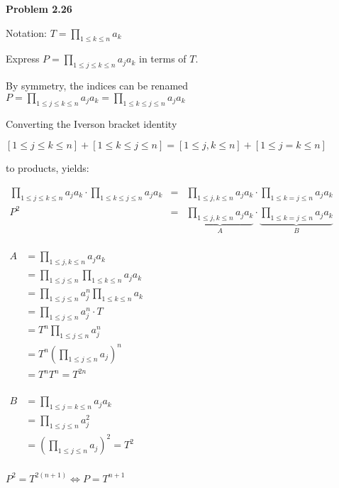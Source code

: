 \documentclass[a4paper,10pt,fleqn]{article}
\begin{document}
\newcommand{\ffac}[1]{%
  x^{\underline{#1}}%
}
\newcommand{\ffact}[2]{%
  {#1}^{\underline{#2}}%
}

\everymath{\displaystyle}

\textbf{Problem 2.26}

Notation: $T = \prod_{1\leq k \leq n} a_k$

Express $P=\prod_{1\leq j \leq k \leq n} a_j a_k$ in terms of $T$.

By symmetry, the indices can be renamed $P=\prod_{1\leq j \leq k \leq n} a_j a_k=\prod_{1\leq k \leq j \leq n} a_j a_k$

Converting the Iverson bracket identity

$ [1\leq j\leq k\leq n] + [1\leq k\leq j \leq n] = [1\leq j,k \leq n] + [1\leq j=k \leq n] $

to products, yields:

$
\begin{array}{rll}
\prod_{1\leq j \leq k \leq n} a_j a_k \cdot \prod_{1\leq k \leq j \leq n} a_j a_k & = &
 \prod_{1\leq j,k \leq n} a_j a_k \cdot \prod_{1\leq k=j \leq n} a_j a_k \\
P^2 & = & \underbrace{\prod_{1\leq j,k \leq n} a_j a_k}_{A} \cdot \underbrace{\prod_{1\leq k=j \leq n} a_j a_k}_{B} \\
\end{array}
$

\begin{multicols}{2}

$
\begin{array}{ll}
A & = \prod_{1\leq j,k \leq n} a_j a_k \\
  & = \prod_{1\leq j\leq n} \prod_{1\leq k\leq n} a_j a_k\\
  & = \prod_{1\leq j\leq n} a_j^n \prod_{1\leq k\leq n} a_k \\
  & = \prod_{1\leq j\leq n} a_j^n \cdot T\\
  & = T^n \prod_{1\leq j\leq n} a_j^n \\
  & = T^n \left(\prod_{1\leq j\leq n} a_j\right)^n \\  
  & = T^n T^n = T^{2n}\\
\end{array}
$

\columnbreak

$
\begin{array}{ll}
B & = \prod_{1\leq j=k \leq n} a_j a_k \\
  & = \prod_{1\leq j \leq n} a_j^2 \\
  & = \left(\prod_{1\leq j \leq n} a_j\right)^2 = T^2 \\
\end{array}
$

\end{multicols}

$P^2 = T^{2(n+1)} \iff P = T^{n+1}$
\end{document}
